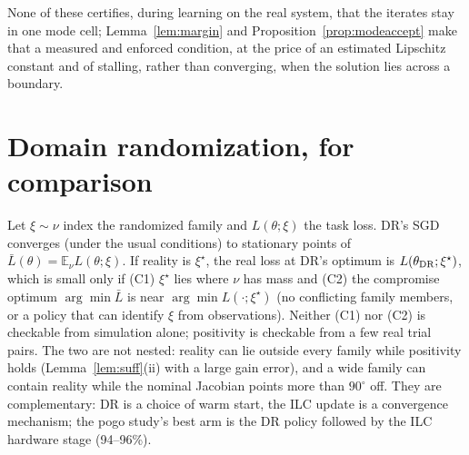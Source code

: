 \documentclass[11pt]{article}
\theoremstyle{definition}
\theoremstyle{remark}
\newcommand{\E}{\mathbb{E}}
\begin{document}
None of these certifies, during learning on the real system, that the iterates stay in one mode cell;
Lemma~\ref{lem:margin} and Proposition~\ref{prop:modeaccept} make that a measured and enforced condition, at the price of
an estimated Lipschitz constant and of stalling, rather than converging, when the solution lies across a boundary.

\section{Domain randomization, for comparison}
Let $\xi\sim\nu$ index the randomized family and $L(\theta;\xi)$ the task loss. DR's SGD converges (under the usual
conditions) to stationary points of $\bar L(\theta)=\E_\nu L(\theta;\xi)$. If reality is $\xi^\star$, the real loss at
DR's optimum is $L(\theta_{\rm DR};\xi^\star)$, which is small only if (C1) $\xi^\star$ lies where $\nu$ has mass and
(C2) the compromise optimum $\arg\min\bar L$ is near $\arg\min L(\cdot;\xi^\star)$ (no conflicting family members, or a
policy that can identify $\xi$ from observations). Neither (C1) nor (C2) is checkable from simulation alone; positivity
is checkable from a few real trial pairs. The two are not nested: reality can lie outside every family while positivity
holds (Lemma~\ref{lem:suff}(ii) with a large gain error), and a wide family can contain reality while the nominal
Jacobian points more than $90^\circ$ off. They are complementary: DR is a choice of warm start, the ILC update is a
convergence mechanism; the pogo study's best arm is the DR policy followed by the ILC hardware stage (94--96\%).

\end{document}
